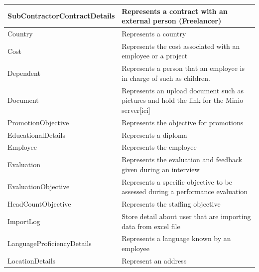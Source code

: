 \documentclass[12pt,a4paper,table,english]{article}
\begin{document}
\begin{center}
\begin{tabularx}{\textwidth}{| l | X |}
			SubContractorContractDetails & Represents a contract with an external person (Freelancer) \\\hline
		
			Country & Represents a country\\\hline
			
			Cost & Represents the cost associated with an employee or a project \\\hline
			
			Dependent & Represents a person that an employee is in charge of such as children.\\\hline
			
			Document & Represents an upload document such as pictures and hold the link for the Minio server[ici]\\\hline
			
			PromotionObjective & Represents the objective for promotions \\\hline
			
			EducationalDetails & Represents a diploma\\\hline
			
			Employee & Represents the employee \\\hline
			
			Evaluation & Represents the evaluation and feedback given during an interview \\\hline
			
			EvaluationObjective & Represents a specific objective to be assessed during a performance evaluation \\\hline
			
			HeadCountObjective & Represents the staffing objective \\\hline
			
			ImportLog & Store detail about user that are importing data from excel file\\\hline
			
			LanguageProficiencyDetails & Represents a language known by an employee\\\hline
						
			LocationDetails & Represent an address\\\hline
			
			
		\end{tabularx}
	\end{center}
\end{document}
